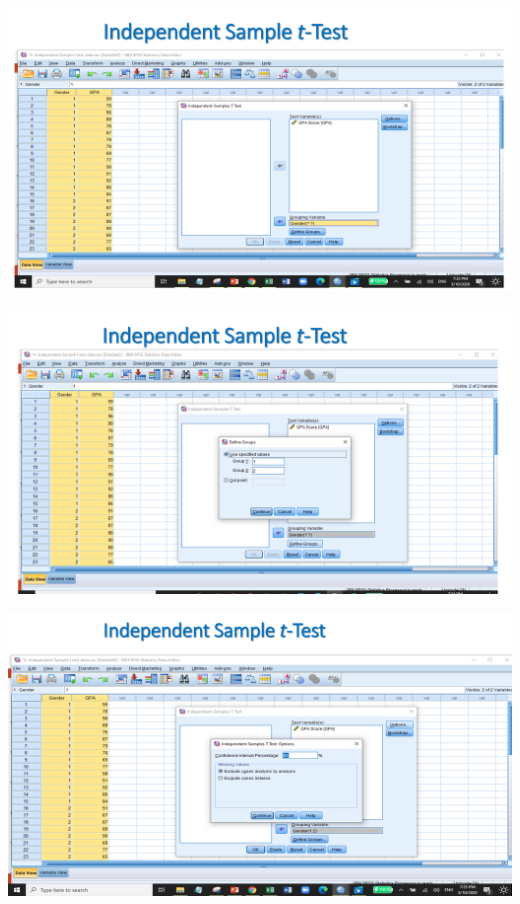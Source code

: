 \documentclass[
  letterpaper,
  DIV=11,
  numbers=noendperiod]{scrreprt}
\begin{document}
\includegraphics{images/slides/img_Page_097.png}

\includegraphics{images/slides/img_Page_098.png}

\includegraphics{images/slides/img_Page_099.png}
\end{document}
